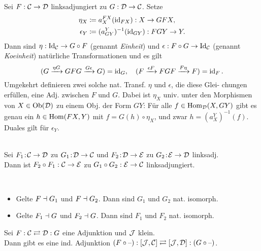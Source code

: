 \documentclass{cheat-sheet}
\begin{document}
\begin{bem}
  Sei $F : \mathcal{C} \to \mathcal{D}$ linksadjungiert zu $G : \mathcal{D} \to \mathcal{C}$. Setze
  \begin{align*}
    \eta_X & \coloneqq a_X^{FX}(\operatorname{id}_{FX}) : X \to GFX, \\
    \epsilon_Y & \coloneqq (a_{GY}^Y)^{-1}(\operatorname{id}_{GY}) : FGY \to Y.
  \end{align*}
  Dann sind $\eta : \operatorname{Id}_{\mathcal{C}} \to G \circ F$ (genannt \emph{Einheit}) und $\epsilon : F \circ G \to \operatorname{Id}_{\mathcal{C}}$ (genannt \emph{Koeinheit}) natürliche Transformationen und es gilt
  \[
    (G \xrightarrow{\eta G} GFG \xrightarrow{G \epsilon} G) = \operatorname{id}_G, \quad
    (F \xrightarrow{\epsilon F} FGF \xrightarrow{F \eta} F) = \operatorname{id}_F.
  \]
  Umgekehrt definieren zwei solche nat. Transf. $\eta$ und $\epsilon$, die diese Glei- chungen erfüllen, eine Adj. zwischen $F$ und $G$.
  Dabei ist $\eta_X$ univ. unter den Morphismen von $X \in \operatorname{Ob}(\mathcal{D})$ zu einem Obj. der Form $GY$:
  Für alle $f \in \operatorname{Hom}_{\mathcal{D}}(X, GY)$ gibt es genau ein $h \in \operatorname{Hom}(FX, Y)$ mit $f = G(h) \circ \eta_X$, und zwar $h = (a_X^Y)^{-1}(f)$. Duales gilt für $\epsilon_Y$.
\end{bem}

\begin{lem}\mbox{}\\
  Sei $F_1 \!:\! \mathcal{C} \to \mathcal{D}$ zu $G_1 \!:\! \mathcal{D} \to \mathcal{C}$ und $F_2 \!:\! \mathcal{D} \to \mathcal{E}$ zu $G_2 \!:\! \mathcal{E} \to \mathcal{D}$ linksadj. \\
  Dann ist $F_2 \circ F_1 : \mathcal{C} \to \mathcal{E}$ zu $G_1 \circ G_2 : \mathcal{E} \to \mathcal{C}$ linksadjungiert.
\end{lem}

\begin{lem}\mbox{}\\
  \begin{itemize}
    \item Gelte $F \dashv G_1$ und $F \dashv G_2$. Dann sind $G_1$ und $G_2$ nat. isomorph.
    \item Gelte $F_1 \dashv G$ und $F_2 \dashv G$. Dann sind $F_1$ und $F_2$ nat. isomorph.
  \end{itemize}
\end{lem}

\begin{bem}
  Sei $F : \mathcal{C} \rightleftarrows \mathcal{D} : G$ eine Adjunktion und $\mathcal{J}$ klein. \\
  Dann gibt es eine ind. Adjunktion $(F \circ \text{--}) : [\mathcal{J}, \mathcal{C}] \rightleftarrows [\mathcal{J}, \mathcal{D}] : (G \circ \text{--})$.
\end{bem}
\end{document}
